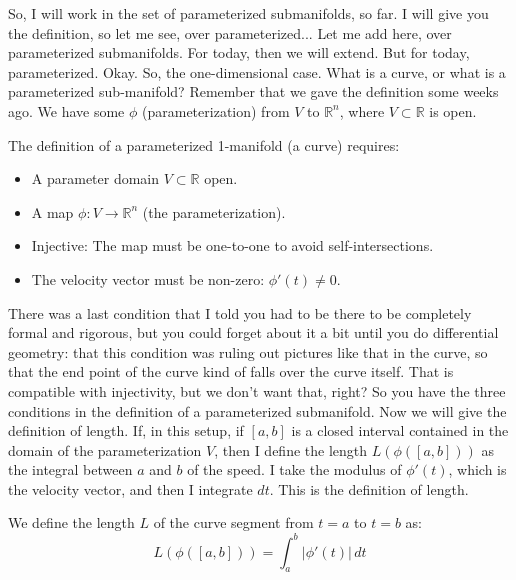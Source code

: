 \begin{spoken_clean}[00:09:50 - 00:11:00]
So, I will work in the set of parameterized submanifolds, so far. I will give you the definition, so let me see, over parameterized... Let me add here, over parameterized submanifolds. For today, then we will extend. But for today, parameterized. Okay. So, the one-dimensional case. What is a curve, or what is a parameterized sub-manifold? Remember that we gave the definition some weeks ago. We have some $\phi$ (parameterization) from $V$ to $\mathbb{R}^n$, where $V \subset \mathbb{R}$ is open.
\end{spoken_clean}

\begin{math_stroke}
The definition of a parameterized 1-manifold (a curve) requires:
\begin{itemize}
    \item A parameter domain $V \subset \mathbb{R}$ open.
    \item A map $\phi: V \to \mathbb{R}^n$ (the parameterization).
    \item Injective: The map must be one-to-one to avoid self-intersections.
    \item The velocity vector must be non-zero: $\phi'(t) \neq 0$.
\end{itemize}
\end{math_stroke}

\begin{spoken_clean}[00:11:00 - 00:12:03]
There was a last condition that I told you had to be there to be completely formal and rigorous, but you could forget about it a bit until you do differential geometry: that this condition was ruling out pictures like that in the curve, so that the end point of the curve kind of falls over the curve itself. That is compatible with injectivity, but we don't want that, right? So you have the three conditions in the definition of a parameterized submanifold. Now we will give the definition of length. If, in this setup, if $[a,b]$ is a closed interval contained in the domain of the parameterization $V$, then I define the length $L(\phi([a,b]))$ as the integral between $a$ and $b$ of the speed. I take the modulus of $\phi'(t)$, which is the velocity vector, and then I integrate $dt$. This is the definition of length.
\end{spoken_clean}

\begin{math_stroke}
We define the length $L$ of the curve segment from $t=a$ to $t=b$ as:
\begin{equation} \label{eq:curvelength}
L(\phi([a,b])) = \int_a^b |\phi'(t)| \, dt
\end{equation}
\end{math_stroke}

